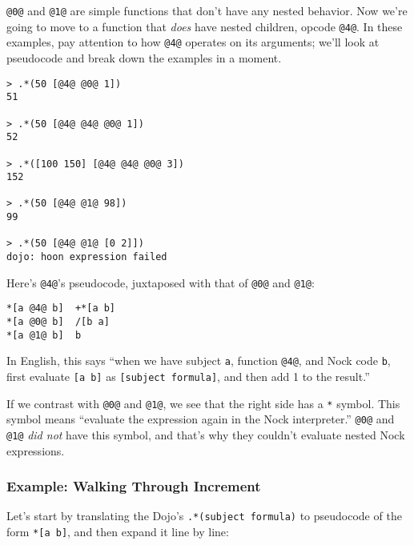 \documentclass[twoside]{article}
\begin{document}
\lstinline[style=inlinecode]{@0@} and \lstinline[style=inlinecode]{@1@} are simple functions that don't have any nested behavior. Now we're going to move to a function that \emph{does} have nested children, opcode \lstinline[style=inlinecode]{@4@}.  In these examples, pay attention to how \lstinline[style=inlinecode]{@4@} operates on its arguments; we'll look at pseudocode and break down the examples in a moment.

\begin{lstlisting}[style=listingblock]
> .*(50 [@4@ @0@ 1])
51

> .*(50 [@4@ @4@ @0@ 1])
52

> .*([100 150] [@4@ @4@ @0@ 3])
152

> .*(50 [@4@ @1@ 98])
99

> .*(50 [@4@ @1@ [0 2]])
dojo: hoon expression failed
\end{lstlisting}

Here's \lstinline[style=inlinecode]{@4@}'s pseudocode, juxtaposed with that of \lstinline[style=inlinecode]{@0@} and \lstinline[style=inlinecode]{@1@}:

\begin{lstlisting}[style=listingcode]
*[a @4@ b]  +*[a b]
*[a @0@ b]  /[b a]
*[a @1@ b]  b
\end{lstlisting}

In English, this says “when we have subject \lstinline[style=inlinecode]{a}, function \lstinline[style=inlinecode]{@4@}, and Nock code \lstinline[style=inlinecode]{b}, first evaluate \lstinline[style=inlinecode]{[a b]} as \lstinline[style=inlinecode]{[subject formula]}, and then add 1 to the result.”

If we contrast with \lstinline[style=inlinecode]{@0@} and \lstinline[style=inlinecode]{@1@}, we see that the right side has a \lstinline[style=inlinecode]{*} symbol. This symbol means “evaluate the expression again in the Nock interpreter.” \lstinline[style=inlinecode]{@0@} and \lstinline[style=inlinecode]{@1@} \emph{did not} have this symbol, and that's why they couldn't evaluate nested Nock expressions.

\subsubsection{Example:  Walking Through Increment}

Let's start by translating the Dojo's \lstinline[style=inlinecode]{.*(subject formula)} to pseudocode of the form \lstinline[style=inlinecode]{*[a b]}, and then expand it line by line:
\end{document}
